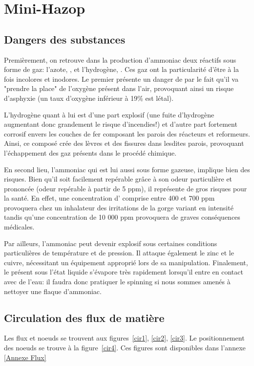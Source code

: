 \chapter{Mini-Hazop}
\section{Dangers des substances}
Premièrement, on retrouve dans la production d'ammoniac deux réactifs sous forme de gaz: l'azote, , et l'hydrogène, . Ces gaz ont la particularité d'être à la fois incolores et inodores. Le premier présente un danger de par le fait qu'il va "prendre la place" de l'oxygène présent dans l'air, provoquant ainsi un risque d'asphyxie (un taux d'oxygène inférieur à 19\% est létal). 
		
		L'hydrogène quant à lui est d'une part explosif (une fuite d'hydrogène augmentant donc grandement le risque d'incendies!) et d'autre part fortement corrosif envers les couches de fer composant les parois des réacteurs et reformeurs. Ainsi, ce composé crée des lèvres et des fissures dans lesdites parois, provoquant l'échappement des gaz présents dans le procédé chimique.
		
		En second lieu, l'ammoniac qui est lui aussi sous forme gazeuse, implique bien des risques. Bien qu'il soit facilement repérable grâce à son odeur particulière et prononcée (odeur repérable à partir de 5 ppm), il représente de gros risques pour la santé. En effet, une concentration d' comprise entre 400 et 700 ppm provoquera chez un inhalateur des irritations de la gorge variant en intensité tandis qu'une concentration de 10 000 ppm provoquera de graves conséquences médicales.

		Par ailleurs, l'ammoniac peut devenir explosif sous certaines conditions particulières de température et de pression. Il attaque également le zinc et le cuivre, nécessitant un équipement approprié lors de sa manipulation. Finalement, le  présent sous l'état liquide s'évapore très rapidement lorsqu'il entre en contact avec de l'eau: il faudra donc pratiquer le spinning si nous sommes amenés à nettoyer une  flaque d'ammoniac.

\section{Circulation des flux de matière}  


Les flux et noeuds se trouvent aux figures~\ref{cir1}, \ref{cir2}, \ref{cir3}.
Le positionnement des noeuds se trouve à la figure~\ref{cir4}. Ces figures sont disponibles dans l'annexe \ref{Annexe Flux}

